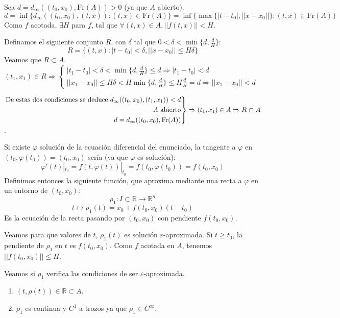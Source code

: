 \documentclass[11pt]{article}
\makeatletter
\theoremstyle{theorem-style}  %
\renewenvironment{proof}[1][\proofname]{\par
	\pushQED{\qed}%
	\normalfont \topsep6\p@\@plus6\p@\relax
	\list{}{%
		\settowidth{\leftmargin}{\quad:\hskip\labelsep}%
		\setlength{\labelwidth}{0pt}%
		\setlength{\itemindent}{-\leftmargin}%
	}%
	\item[\hskip\labelsep\itshape#1\@addpunct{:}]\ignorespaces
}{%
	\popQED\endlist\@endpefalse
}
\theoremstyle{definition-style}
\theoremstyle{example-style}
\newenvironment{rcases}
{\left.\begin{aligned}}
	{\end{aligned}\right\rbrace}
\makeatother
\begin{document}
\begin{proof}
	Sea $ d=d_\infty((t_0, x_0), \text{Fr} (A))>0 $ (ya que $ A $ abierto).
	\[ d=\inf \{d_\infty ( (t_0,x_0), (t,x)):(t,x)\in \text{Fr} (A) \}=\inf \{\max \{|t-t_0|,||x-x_0||\}:(t,x)\in \text{Fr} (A)\}\]
	Como $ f $ acotada, $ \exists H $ para $ f $, tal que $ \forall(t,x) \in A, ||f(t,x)||<H $.
	
	Definamos el siguiente conjunto $ R $, con $ \delta $ tal que $ 0<\delta<\min \{d, \frac{d}{H}\} $:
	\[ R=\{(t,x):|t-t_0|<\delta, ||x-x_0||\leq H\delta\} \]
	Veamos que $ R \subset A $. $ (t_1,x_1)\in R \Rightarrow \begin{cases}
	|t_1-t_0|<\delta<\min\{d,\frac{d}{H}\}\leq d\Rightarrow |t_1-t_0|<d\\
	||x_1-x_0||\leq H\delta<H\min\{d,\frac{d}{H}\}\leq H \frac{d}{H}=d \Rightarrow ||x_1-x_0||<d
	\end{cases}$  
	
	$\begin{rcases}
	\text{De estas dos condiciones se deduce } d_\infty ( (t_0,x_0), (t_1,x_1)) <d\\
	A \text{ abierto}\\
	d=d_\infty((t_0, x_0), \text{Fr} (A))
	\end{rcases} \Rightarrow (t_1,x_1)\in A \Rightarrow R \subset A$.
	
	Si existe $ \varphi $ solución de la ecuación diferencial del enunciado, la tangente a $ \varphi $ en $ (t_0,\varphi(t_0))=(t_0,x_0) $ sería (ya que $ \varphi $ es solución):
	\[ \varphi'(t)|_{t_0}=f(t, \varphi(t))|_{t_0}=f(t_0,\varphi (t_0))=f(t_0,x_0) \]
	Definimos entonces la siguiente función, que aproxima mediante una recta a $ \varphi $ en un entorno de $ (t_0,x_0) $: 
	\[ \rho_1:I\subset \mathbb{R}\longrightarrow \mathbb{R}^n \]
	\[ t \mapsto \rho_1(t)=x_0+f(t_0,x_0)(t-t_0) \]
	Es la ecuación de la recta pasando por $ (t_0,x_0) $ con pendiente $ f(t_0,x_0) $.
	
	Veamos para que valores de $ t $, $ \rho_1(t) $ es solución $ \varepsilon $-aproximada. 
	Si $ t\geq t_0 $, la pendiente de $ \rho_1 $ en $ t $ es $ f(t_0,x_0) $.
	Como $ f $ acotada en $ A $, tenemos $ ||f(t_0,x_0)||\leq H $.
	
	Veamos si $ \rho_1 $ verifica las condiciones de ser $ \varepsilon $-aproximada.
	\begin{enumerate}[\qquad i)]
		\item  $ (t,\rho(t)) \in \mathbb{R}\subset A$.
		
		\item $ \rho_1 $ es continua y $ C^1 $ a trozos ya que $ \rho_1 \in C^\infty $.
		

\end{enumerate}
\end{proof}
\end{document}
